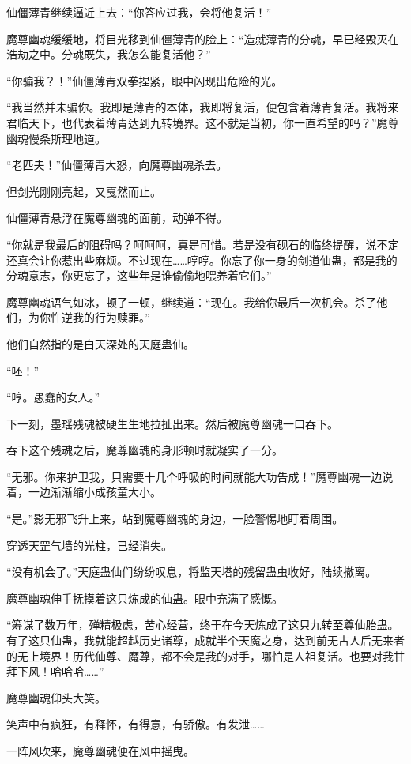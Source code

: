 \begin{this_body}
仙僵薄青继续逼近上去：“你答应过我，会将他复活！”

魔尊幽魂缓缓地，将目光移到仙僵薄青的脸上：“造就薄青的分魂，早已经毁灭在浩劫之中。分魂既失，我怎么能复活他？”

“你骗我？！”仙僵薄青双拳捏紧，眼中闪现出危险的光。

“我当然并未骗你。我即是薄青的本体，我即将复活，便包含着薄青复活。我将来君临天下，也代表着薄青达到九转境界。这不就是当初，你一直希望的吗？”魔尊幽魂慢条斯理地道。

“老匹夫！”仙僵薄青大怒，向魔尊幽魂杀去。

但剑光刚刚亮起，又戛然而止。

仙僵薄青悬浮在魔尊幽魂的面前，动弹不得。

“你就是我最后的阻碍吗？呵呵呵，真是可惜。若是没有砚石的临终提醒，说不定还真会让你惹出些麻烦。不过现在……哼哼。你忘了你一身的剑道仙蛊，都是我的分魂意志，你更忘了，这些年是谁偷偷地喂养着它们。”

魔尊幽魂语气如冰，顿了一顿，继续道：“现在。我给你最后一次机会。杀了他们，为你忤逆我的行为赎罪。”

他们自然指的是白天深处的天庭蛊仙。

“呸！”

“哼。愚蠢的女人。”

下一刻，墨瑶残魂被硬生生地拉扯出来。然后被魔尊幽魂一口吞下。

吞下这个残魂之后，魔尊幽魂的身形顿时就凝实了一分。

“无邪。你来护卫我，只需要十几个呼吸的时间就能大功告成！”魔尊幽魂一边说着，一边渐渐缩小成孩童大小。

“是。”影无邪飞升上来，站到魔尊幽魂的身边，一脸警惕地盯着周围。

穿透天罡气墙的光柱，已经消失。

“没有机会了。”天庭蛊仙们纷纷叹息，将监天塔的残留蛊虫收好，陆续撤离。

魔尊幽魂伸手抚摸着这只炼成的仙蛊。眼中充满了感慨。

“筹谋了数万年，殚精极虑，苦心经营，终于在今天炼成了这只九转至尊仙胎蛊。有了这只仙蛊，我就能超越历史诸尊，成就半个天魔之身，达到前无古人后无来者的无上境界！历代仙尊、魔尊，都不会是我的对手，哪怕是人祖复活。也要对我甘拜下风！哈哈哈……”

魔尊幽魂仰头大笑。

笑声中有疯狂，有释怀，有得意，有骄傲。有发泄……

一阵风吹来，魔尊幽魂便在风中摇曳。


\end{this_body}
